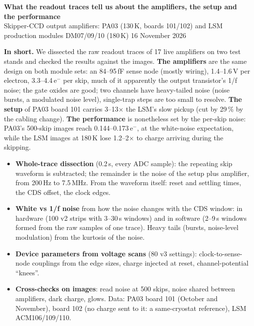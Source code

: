 \documentclass[10pt]{article}
\newcommand{\head}[1]{\par\smallskip{\color{acc}\large\bfseries #1}\par\vspace{1pt}}
\newcommand{\key}[2][boxbg]{\par\colorbox{#1}{\parbox{\dimexpr\linewidth-2\fboxsep}{#2}}\par}
\begin{document}
{\color{acc}\LARGE\bfseries What the readout traces tell us about the amplifiers, the setup and the performance}\\[2pt]
{\small Skipper-CCD output amplifiers: PA03 (130\,K, boards 101/102) and LSM production modules DM07/09/10 (180\,K)
\textperiodcentered{} 16 November 2026}

\key{\textbf{In short.} We dissected the raw readout traces of 17 live amplifiers on two test stands and checked the
results against the images. \textbf{The amplifiers} are the same design on both module sets: an 84--95\,fF sense node
(mostly wiring), 1.4--1.6\,\textmu V per electron, 3.3--4.4\,e$^-$ per skip, much of it apparently the output
transistor's 1/f noise; the gate oxides are good; two channels have heavy-tailed noise (noise bursts, a modulated noise level), single-trap steps are too small to resolve.
\textbf{The setup} of PA03 board 101 carries 3--13$\times$ the LSM's slow pickup (cut by 29\,\% by the cabling change).
\textbf{The performance} is nonetheless set by the per-skip noise: PA03's 500-skip images reach 0.144--0.173\,e$^-$, at the
white-noise expectation, while the LSM images at 180\,K lose 1.2--2$\times$ to charge arriving during the skipping.}

\head{1.\ What was done}
\begin{itemize}
\item \textbf{Whole-trace dissection} (0.2\,s, every ADC sample): the repeating skip waveform is subtracted; the remainder
  is the noise of the setup plus amplifier, from 200\,Hz to 7.5\,MHz. From the waveform itself: reset and settling times,
  the CDS offset, the clock edges.
\item \textbf{White vs 1/f noise} from how the noise changes with the CDS window: in hardware (100 v2 strips with 3--30\,\textmu s
  windows) and in software (2--9\,\textmu s windows formed from the raw samples of one trace). Heavy tails (bursts, noise-level modulation) from the
  kurtosis of the noise.
\item \textbf{Device parameters from voltage scans} (80 v3 settings): clock-to-sense-node couplings from the edge sizes,
  charge injected at reset, channel-potential ``knees''.
\item \textbf{Cross-checks on images}: read noise at 500 skips, noise shared between amplifiers, dark charge, glows.
  Data: PA03 board 101 (October and November), board 102 (no charge sent to it: a same-cryostat reference), LSM ACM106/109/110.
\end{itemize}
\end{document}
